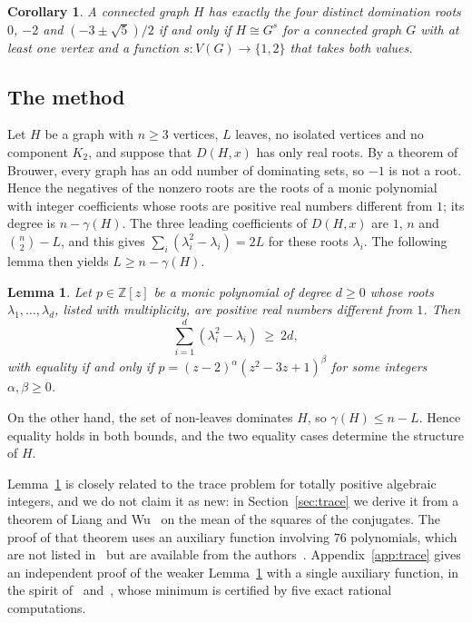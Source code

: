\documentclass{amsart}
\newtheorem{lemma}[theorem]{Lemma}
\newtheorem{corollary}[theorem]{Corollary}
\theoremstyle{definition}
\theoremstyle{remark}
\numberwithin{equation}{section}
\newcommand{\Z}{\mathbb{Z}}
\begin{document}
\begin{corollary}\label{cor:four}
A connected graph $H$ has exactly the four distinct domination roots $0$, $-2$ and $(-3\pm\sqrt5)/2$ if and only if $H\cong G^s$ for a connected graph $G$ with at least one vertex and a function $s\colon V(G)\to\{1,2\}$ that takes both values.
\end{corollary}

\subsection*{The method}
Let $H$ be a graph with $n\ge 3$ vertices, $L$ leaves, no isolated vertices and no component $K_2$, and suppose that $D(H,x)$ has only real roots. By a theorem of Brouwer, every graph has an odd number of dominating sets, so $-1$ is not a root. Hence the negatives of the nonzero roots are the roots of a monic polynomial with integer coefficients whose roots are positive real numbers different from $1$; its degree is $n-\gamma(H)$. The three leading coefficients of $D(H,x)$ are $1$, $n$ and $\binom n2-L$, and this gives $\sum_i(\lambda_i^2-\lambda_i)=2L$ for these roots $\lambda_i$. The following lemma then yields $L\ge n-\gamma(H)$.

\begin{lemma}\label{lem:trace}
Let $p\in\Z[z]$ be a monic polynomial of degree $d\ge0$ whose roots $\lambda_1,\dots,\lambda_d$, listed with multiplicity, are positive real numbers different from $1$. Then
\[
\sum_{i=1}^d(\lambda_i^2-\lambda_i)\ \ge\ 2d,
\]
with equality if and only if $p=(z-2)^{\alpha}(z^2-3z+1)^{\beta}$ for some integers $\alpha,\beta\ge0$.
\end{lemma}

On the other hand, the set of non-leaves dominates $H$, so $\gamma(H)\le n-L$. Hence equality holds in both bounds, and the two equality cases determine the structure of $H$.

Lemma~\ref{lem:trace} is closely related to the trace problem for totally positive algebraic integers, and we do not claim it as new: in Section~\ref{sec:trace} we derive it from a theorem of Liang and Wu~\cite[Theorem~1.4]{LW11} on the mean of the squares of the conjugates. The proof of that theorem uses an auxiliary function involving $76$ polynomials, which are not listed in~\cite{LW11} but are available from the authors~\cite[Section~3.3]{LW11}. Appendix~\ref{app:trace} gives an independent proof of the weaker Lemma~\ref{lem:trace} with a single auxiliary function, in the spirit of~\cite{Smy84} and~\cite[Section~2]{LW11}, whose minimum is certified by five exact rational computations.
\end{document}
